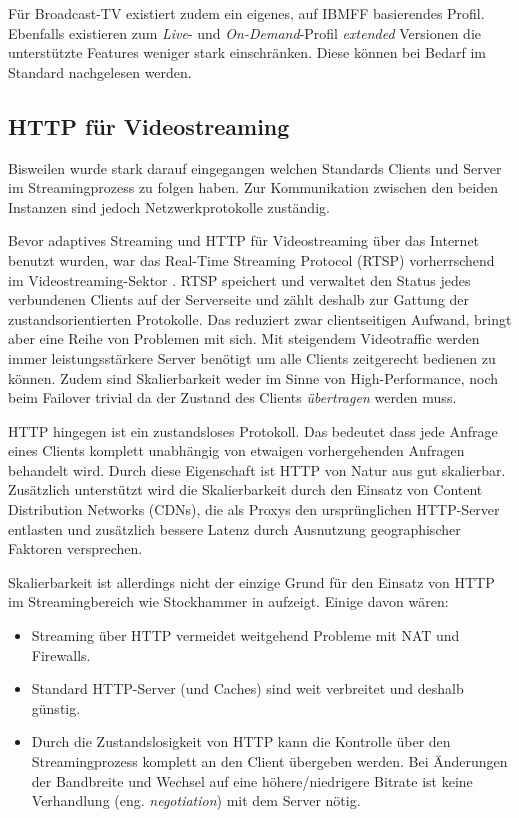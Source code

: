 \documentclass[paper = a4, fontsize = 12pt, parskip = half]{scrartcl} %
\begin{document}
Für Broadcast-TV existiert zudem ein eigenes, auf IBMFF basierendes Profil. Ebenfalls existieren zum \textit{Live}- und \textit{On-Demand}-Profil \textit{extended} Versionen die unterstützte Features weniger stark einschränken. Diese können bei Bedarf im Standard nachgelesen werden.

\subsection{HTTP für Videostreaming}
Bisweilen wurde stark darauf eingegangen welchen Standards Clients und Server im Streamingprozess zu folgen haben. Zur Kommunikation zwischen den beiden Instanzen sind jedoch Netzwerkprotokolle zuständig.

Bevor adaptives Streaming und HTTP für Videostreaming über das Internet benutzt wurden, war das Real-Time Streaming Protocol (RTSP) vorherrschend im Videostreaming-Sektor \cite{stockhammer_dynamic_2011}. RTSP speichert und verwaltet den Status jedes verbundenen Clients auf der Serverseite und zählt deshalb zur Gattung der zustandsorientierten Protokolle. Das reduziert zwar clientseitigen Aufwand, bringt aber eine Reihe von Problemen mit sich. Mit steigendem Videotraffic werden immer leistungsstärkere Server benötigt um alle Clients zeitgerecht bedienen zu können. \cite{stockhammer_dynamic_2011} Zudem sind Skalierbarkeit weder im Sinne von High-Performance, noch beim Failover trivial da der Zustand des Clients \textit{übertragen} werden muss.

HTTP hingegen ist ein zustandsloses Protokoll. Das bedeutet dass jede Anfrage eines Clients komplett unabhängig von etwaigen vorhergehenden Anfragen behandelt wird. Durch diese Eigenschaft ist HTTP von Natur aus gut skalierbar. Zusätzlich unterstützt wird die Skalierbarkeit durch den Einsatz von Content Distribution Networks (CDNs), die als Proxys den ursprünglichen HTTP-Server entlasten und zusätzlich bessere Latenz durch Ausnutzung geographischer Faktoren versprechen. \cite{buyya_content_2008}

Skalierbarkeit ist allerdings nicht der einzige Grund für den Einsatz von HTTP im Streamingbereich wie Stockhammer in \cite{stockhammer_dynamic_2011} aufzeigt. Einige davon wären: 

\begin{itemize}
	\item Streaming über HTTP vermeidet weitgehend Probleme mit NAT und Firewalls.
	\item Standard HTTP-Server (und Caches) sind weit verbreitet und deshalb günstig.
	\item Durch die Zustandslosigkeit von HTTP kann die Kontrolle über den Streamingprozess komplett an den Client übergeben werden. Bei Änderungen der Bandbreite und Wechsel auf eine höhere/niedrigere Bitrate ist keine Verhandlung (eng. \textit{negotiation}) mit dem Server nötig.
\end{itemize}
\end{document}
